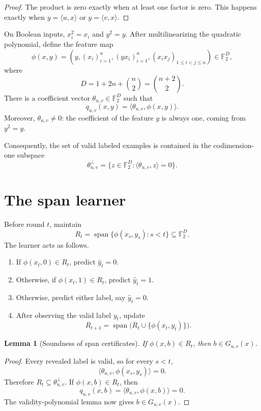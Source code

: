\documentclass[11pt]{article}
\newtheorem{lemma}[theorem]{Lemma}
\theoremstyle{definition}
\theoremstyle{remark}
\newcommand{\F}{\mathbb{F}_2}
\newcommand{\ip}[2]{\langle #1,#2\rangle}
\begin{document}
\begin{proof}
The product is zero exactly when at least one factor is zero.  This happens
exactly when $y=\ip{u}{x}$ or $y=\ip{v}{x}$.
\end{proof}

On Boolean inputs, $x_i^2=x_i$ and $y^2=y$.  After multilinearizing the
quadratic polynomial, define the feature map
\[
\phi(x,y)
=
\left(
  y,
  (x_i)_{i=1}^n,
  (yx_i)_{i=1}^n,
  (x_ix_j)_{1\leq i<j\leq n}
\right)
\in\F^D,
\]
where
\[
D
=1+2n+\binom{n}{2}
=\binom{n+2}{2}.
\]
There is a coefficient vector $\theta_{u,v}\in\F^D$ such that
\[
  q_{u,v}(x,y)=\ip{\theta_{u,v}}{\phi(x,y)}.
\]
Moreover, $\theta_{u,v}\neq 0$: the coefficient of the feature $y$ is always
one, coming from $y^2=y$.

Consequently, the set of valid labeled examples is contained in the
codimension-one subspace
\[
  \theta_{u,v}^{\perp}
  =
  \{z\in\F^D:\ip{\theta_{u,v}}{z}=0\}.
\]

\section{The span learner}

Before round $t$, maintain
\[
R_t
=
\operatorname{span}
\{\phi(x_s,y_s):s<t\}
\subseteq\F^D.
\]
The learner acts as follows.

\begin{enumerate}[label=\arabic*.]
  \item If $\phi(x_t,0)\in R_t$, predict $\widehat y_t=0$.
  \item Otherwise, if $\phi(x_t,1)\in R_t$, predict
        $\widehat y_t=1$.
  \item Otherwise, predict either label, say $\widehat y_t=0$.
  \item After observing the valid label $y_t$, update
  \[
    R_{t+1}
    =
    \operatorname{span}\bigl(R_t\cup\{\phi(x_t,y_t)\}\bigr).
  \]
\end{enumerate}

\begin{lemma}[Soundness of span certificates]
If $\phi(x,b)\in R_t$, then $b\in G_{u,v}(x)$.
\end{lemma}

\begin{proof}
Every revealed label is valid, so for every $s<t$,
\[
  \ip{\theta_{u,v}}{\phi(x_s,y_s)}=0.
\]
Therefore $R_t\subseteq\theta_{u,v}^{\perp}$.  If
$\phi(x,b)\in R_t$, then
\[
  q_{u,v}(x,b)
  =
  \ip{\theta_{u,v}}{\phi(x,b)}
  =0.
\]
The validity-polynomial lemma now gives $b\in G_{u,v}(x)$.
\end{proof}
\end{document}
